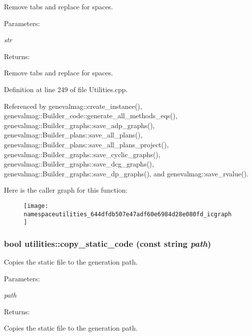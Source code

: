 Remove tabs and replace for spaces. \begin{Desc}
\item[Parameters:]
\begin{description}
\item[{\em str}]\end{description}
\end{Desc}
\begin{Desc}
\item[Returns:]\end{Desc}
Remove tabs and replace for spaces. 

Definition at line 249 of file Utilities.cpp.

Referenced by genevalmag::create\_\-instance(), genevalmag::Builder\_\-code::generate\_\-all\_\-methods\_\-eqs(), genevalmag::Builder\_\-graphs::save\_\-adp\_\-graphs(), genevalmag::Builder\_\-plans::save\_\-all\_\-plans(), genevalmag::Builder\_\-plans::save\_\-all\_\-plans\_\-project(), genevalmag::Builder\_\-graphs::save\_\-cyclic\_\-graphs(), genevalmag::Builder\_\-graphs::save\_\-dcg\_\-graphs(), genevalmag::Builder\_\-graphs::save\_\-dp\_\-graphs(), and genevalmag::save\_\-rvalue().

Here is the caller graph for this function:\nopagebreak
\begin{figure}[H]
\begin{center}
\leavevmode
\texttt{[image: namespaceutilities\_644dfdb507e47adf60e6984d28e080fd\_icgraph]}
\end{center}
\end{figure}
\hypertarget{namespaceutilities_931de9beaef867d11a8695efa2e13e56}{
\subsubsection[{copy\_\-static\_\-code}]{\setlength{\rightskip}{0pt plus 5cm}bool utilities::copy\_\-static\_\-code (const string {\em path})}}
\label{namespaceutilities_931de9beaef867d11a8695efa2e13e56}


Copies the static file to the generation path. \begin{Desc}
\item[Parameters:]
\begin{description}
\item[{\em path}]\end{description}
\end{Desc}
\begin{Desc}
\item[Returns:]\end{Desc}
Copies the static file to the generation path. 

